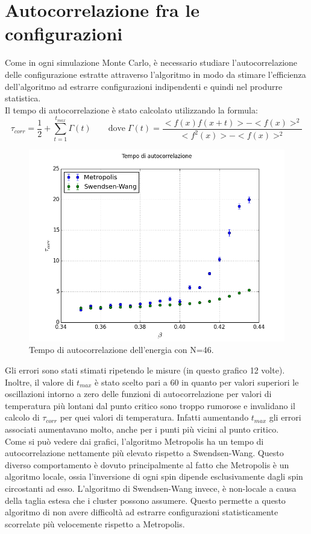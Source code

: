 \section{Autocorrelazione fra le configurazioni}
Come in ogni simulazione Monte Carlo, è necessario studiare l'autocorrelazione delle configurazione estratte attraverso l'algoritmo in modo da stimare l'efficienza dell'algoritmo ad estrarre configurazioni
indipendenti e quindi nel produrre statistica.\\
Il tempo di autocorrelazione è stato calcolato utilizzando la formula:
$$
	\tau_{corr} = \frac{1}{2} + \sum_{t=1}^{t_{max}} \Gamma(t) \qquad \mbox{dove} \; \Gamma(t)= \frac{<f(x)f(x+t)> - <f(x)>^2}{<f^2(x)>-<f(x)>^2}
$$
\begin{figure}[h]
\centering
\includegraphics[scale=0.6]{compare.png}
\caption{Tempo di autocorrelazione dell'energia con N=46.}
\end{figure}
Gli errori sono stati stimati ripetendo le misure (in questo grafico 12 volte).\\
Inoltre, il valore di $ t_{max} $ è stato scelto pari a 60 in quanto per valori superiori le oscillazioni intorno a zero delle funzioni di autocorrelazione per valori di temperatura più lontani dal punto critico sono troppo rumorose e invalidano il calcolo di $\tau_{corr}$ per quei valori di temperatura. Infatti aumentando $t_{max}$ gli errori associati aumentavano molto, anche per i punti più vicini al punto critico.\\ 
Come si può vedere dai grafici, l'algoritmo Metropolis ha un tempo di autocorrelazione nettamente più elevato rispetto a Swendsen-Wang. Questo diverso comportamento è dovuto principalmente al fatto che Metropolis è un algoritmo locale, ossia l'inversione di ogni spin dipende esclusivamente dagli spin circostanti ad esso. L'algoritmo di Swendsen-Wang invece, è non-locale a causa della taglia estesa  che i cluster possono assumere.
Questo permette a questo algoritmo di non avere difficoltà ad estrarre configurazioni statisticamente scorrelate più velocemente rispetto a Metropolis.\\

